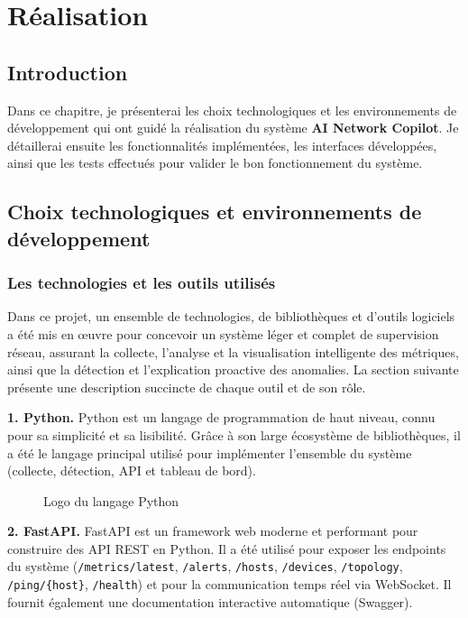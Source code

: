 \documentclass[12pt,a4paper]{report}
\newcommand{\figplaceholder}[2][8cm]{%
  \begin{center}
  \setlength{\fboxsep}{6pt}%
  \fbox{\begin{minipage}[c][#1][c]{0.86\textwidth}
  \centering\itshape\color{grismoyen} #2
  \end{minipage}}
  \end{center}}
\begin{document}
\chapter{Réalisation}

\section{Introduction}
Dans ce chapitre, je présenterai les choix technologiques et les environnements de
développement qui ont guidé la réalisation du système \textbf{AI Network Copilot}.
Je détaillerai ensuite les fonctionnalités implémentées, les interfaces
développées, ainsi que les tests effectués pour valider le bon fonctionnement du
système.

\section{Choix technologiques et environnements de développement}

\subsection{Les technologies et les outils utilisés}
Dans ce projet, un ensemble de technologies, de bibliothèques et d'outils logiciels
a été mis en œuvre pour concevoir un système léger et complet de supervision
réseau, assurant la collecte, l'analyse et la visualisation intelligente des
métriques, ainsi que la détection et l'explication proactive des anomalies. La
section suivante présente une description succincte de chaque outil et de son rôle.

\vspace{0.3cm}
\noindent\textbf{1. Python.}
Python est un langage de programmation de haut niveau, connu pour sa simplicité et
sa lisibilité. Grâce à son large écosystème de bibliothèques, il a été le langage
principal utilisé pour implémenter l'ensemble du système (collecte, détection, API
et tableau de bord).

\begin{figure}[H]
\figplaceholder[3cm]{Figure~6 : Logo Python}
\caption{Logo du langage Python}
\label{fig:python}
\end{figure}

\noindent\textbf{2. FastAPI.}
FastAPI est un framework web moderne et performant pour construire des API REST en
Python. Il a été utilisé pour exposer les endpoints du système
(\texttt{/metrics/latest}, \texttt{/alerts}, \texttt{/hosts}, \texttt{/devices},
\texttt{/topology}, \texttt{/ping/\{host\}}, \texttt{/health}) et pour la
communication temps réel via WebSocket. Il fournit également une documentation
interactive automatique (Swagger).
\end{document}
